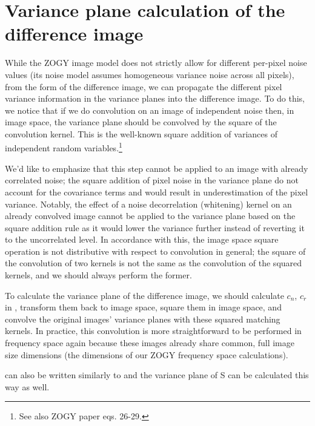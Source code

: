 \section{Variance plane calculation of the difference image\label{sec:varplane}}
\par While the ZOGY image model does not strictly allow for different
per-pixel noise values (its noise model assumes homogeneous variance
noise across all pixels), from the  form of the
difference image, we can propagate the different pixel variance
information in the variance planes into the difference image. To do
this, we notice that if we do convolution on an image of independent
noise then, in image space, the variance plane should be convolved by
the square of the convolution kernel. This is the well-known square
addition of variances of independent random variables.\footnote{See
  also ZOGY paper eqs. 26-29.}
%
\par We'd like to emphasize that this step cannot be applied to an
image with already correlated noise; the square addition of pixel
noise in the variance plane do not account for the covariance terms
and would result in underestimation of the pixel
variance. Notably, the effect of a noise decorrelation
(whitening) kernel on an already convolved image cannot be applied to
the variance plane based on the square addition rule as it would lower
the variance further instead of reverting it to the uncorrelated
level. In accordance with this, the image space square operation is
not distributive with respect to convolution in general; the square of the
convolution of two kernels is not the same as the convolution of the
squared kernels, and we should always perform the former.
%
\par To calculate the variance plane of the difference image, we
should calculate \(c_n\), \(c_r\) in , transform them
back to image space, square them in image space, and convolve the
original images' variance planes with these squared matching
kernels. In practice, this convolution is more straightforward to be
performed in frequency space again because these images already share
common, full image size dimensions (the dimensions of our ZOGY
frequency space calculations).
%
\par {} can also be written similarly to  and
the variance plane of S can be calculated this way as well.
%
